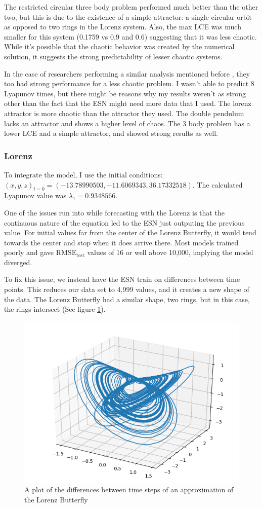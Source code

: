 \documentclass{article}
\begin{document}
The restricted circular three body problem performed much better than the
other two, but this is due to the existence of a simple attractor: a single 
circular orbit as opposed to two rings in the Lorenz system. Also, the max LCE
was much smaller for this system (0.1759 vs 0.9 and 0.6) suggesting that it 
was less chaotic. While
it's possible that the chaotic behavior was created by the numerical
solution, it suggests the strong predictability of lesser chaotic systems.

In the case of researchers performing a similar analysis mentioned before 
\cite{pathak2018model}, they too had strong performance for a less chaotic 
problem. I wasn't able to predict 8 Lyapunov times, but there might be 
reasons why my results weren't as strong other than the fact that
the ESN might need more data that I used.
The lorenz attractor is more chaotic than the attractor they used. The double 
pendulum lacks an attractor and shows a higher level of chaos. The 3 body
problem has a lower LCE and a simple attractor, and showed strong results as 
well.

\subsubsection{Lorenz}

To integrate the model, I use the initial conditions: $(x, y, z)_{t=0} =
(-13.78990503, -11.6069343, 36.17332518)$. The calculated Lyapunov value was
$\lambda_1 = 0.9348566$.

One of the issues run into while forecasting with the Lorenz is that the
continuous nature of the equation led to the ESN just outputing the previous
value. For initial values far from the center of the Lorenz Butterfly, it
would tend towards the center and stop when it does arrive there. Most models
trained poorly and gave $\text{RMSE}_\text{test}$ values of 16 or well above
10,000, implying the model diverged.

To fix this issue, we instead have the ESN train on differences between time
points. This reduces our data set to 4,999 values, and it creates a new shape
of the data. The Lorenz Butterfly had a similar shape, two rings, but in this
case, the rings intersect (See figure \ref{fig:lorenz_diff}).

\begin{figure}[H]
    \centering
    \includegraphics[width=.5\linewidth]{doc/paper/images/lorenz/full_differential.png}
    \caption{A plot of the differences between time steps of an approximation of the Lorenz Butterfly}
    \label{fig:lorenz_diff}
\end{figure}
\end{document}
